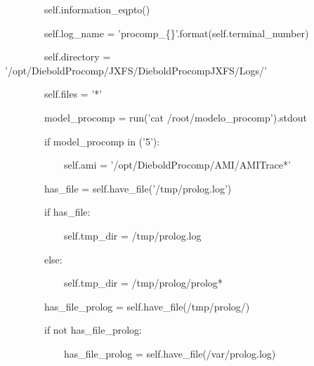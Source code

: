 {\ttfamily\color[rgb]{0.10980392,0.10980392,0.10980392}
    \ \ \ \ \ \ \ \ self.information\_eqpto()}

{\ttfamily\color[rgb]{0.10980392,0.10980392,0.10980392}
    \ \ \ \ \ \ \ \ self.log\_name = 'procomp\_\{\}'.format(self.terminal\_number)}

{\ttfamily\color[rgb]{0.10980392,0.10980392,0.10980392}
    \ \ \ \ \ \ \ \ self.directory = '/opt/DieboldProcomp/JXFS/DieboldProcompJXFS/Logs/'}

{\ttfamily\color[rgb]{0.10980392,0.10980392,0.10980392}
    \ \ \ \ \ \ \ \ self.files = '*'}


    \bigskip

{\ttfamily\color[rgb]{0.10980392,0.10980392,0.10980392}
    \ \ \ \ \ \ \ \ model\_procomp = run('cat /root/modelo\_procomp').stdout}

{\ttfamily\color[rgb]{0.10980392,0.10980392,0.10980392}
    \ \ \ \ \ \ \ \ if model\_procomp in ('5'):}

{\ttfamily\color[rgb]{0.10980392,0.10980392,0.10980392}
    \ \ \ \ \ \ \ \ \ \ \ \ self.ami = '/opt/DieboldProcomp/AMI/AMITrace*'}


    \bigskip

{\ttfamily\color[rgb]{0.10980392,0.10980392,0.10980392}
    \ \ \ \ \ \ \ \ has\_file = self.have\_file('/tmp/prolog.log')}

{\ttfamily\color[rgb]{0.10980392,0.10980392,0.10980392}
    \ \ \ \ \ \ \ \ if has\_file:}

{\ttfamily\color[rgb]{0.10980392,0.10980392,0.10980392}
    \ \ \ \ \ \ \ \ \ \ \ \ self.tmp\_dir = {\textquotedbl}/tmp/prolog.log{\textquotedbl}}

{\ttfamily\color[rgb]{0.10980392,0.10980392,0.10980392}
    \ \ \ \ \ \ \ \ else:}

{\ttfamily\color[rgb]{0.10980392,0.10980392,0.10980392}
    \ \ \ \ \ \ \ \ \ \ \ \ self.tmp\_dir = {\textquotedbl}/tmp/prolog/prolog*{\textquotedbl}}


    \bigskip

{\ttfamily\color[rgb]{0.10980392,0.10980392,0.10980392}
    \ \ \ \ \ \ \ \ has\_file\_prolog = self.have\_file({\textquotedbl}/tmp/prolog/{\textquotedbl})}

{\ttfamily\color[rgb]{0.10980392,0.10980392,0.10980392}
    \ \ \ \ \ \ \ \ if not has\_file\_prolog:}

{\ttfamily\color[rgb]{0.10980392,0.10980392,0.10980392}
    \ \ \ \ \ \ \ \ \ \ \ \ has\_file\_prolog = self.have\_file({\textquotedbl}/var/prolog.log{\textquotedbl})}

